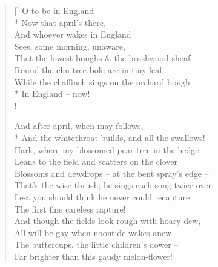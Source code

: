 \documentclass[MAIN]{subfiles}
\begin{document}
\settowidth{\versewidth}{That the lowest boughs and the brushwood sheaf}
\begin{verse}[\versewidth]
O to be in England\\*
Now that april's there,\\
And whoever wakes in England\\
Sees, some morning, unaware,\\
That the lowest boughs \& the brushwood sheaf\\
Round the elm-tree bole are in tiny leaf,\\
While the chaffinch sings on the orchard bough\\*
In England -- now!\\!

And after april, when may follows,\\*
And the whitethroat builds, and all the swallows!\\
Hark, where my blossomed pear-tree in the hedge\\
Leans to the field and scatters on the clover\\
Blossoms and dewdrops -- at the bent spray's edge --\\
That's the wise thrush; he sings each song twice over,\\
Lest you should think he never could recapture\\
The first fine careless rapture!\\
And though the fields look rough with hoary dew,\\
All will be gay when noontide wakes anew\\
The buttercups, the little children's dower --\\
Far brighter than this gaudy melon-flower!
\end{verse}
\end{document}
